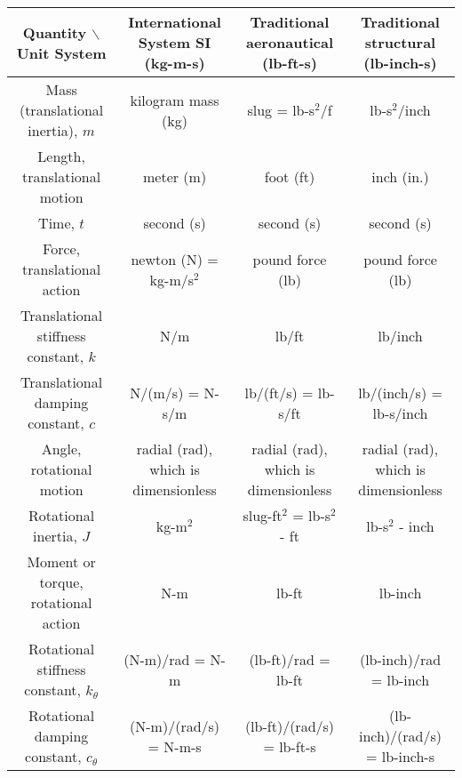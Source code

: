 \documentclass{article}
\begin{document}
\begin{CJK}{UTF8}{gbsn}


\begin{tabular}{|c|c|c|c|}
\hline
Quantity $\backslash$ Unit System & International System SI (kg-m-s) & Traditional aeronautical (lb-ft-s) & Traditional structural (lb-inch-s) \\
\hline
Mass (translational inertia), $m$ & kilogram mass (kg) & slug = lb-s$^2$/f & lb-s$^2$/inch \\
\hline
Length, translational motion & meter (m) & foot (ft) & inch (in.) \\
\hline
Time, $t$ & second (s) & second (s) & second (s) \\
\hline
Force, translational action & newton (N) = kg-m/s$^2$ & pound force (lb) & pound force (lb) \\
\hline
Translational stiffness constant, $k$ & N/m & lb/ft & lb/inch \\
\hline
Translational damping constant, $c$ & N/(m/s) = N-s/m & lb/(ft/s) = lb-s/ft & lb/(inch/s) = lb-s/inch \\
\hline
Angle, rotational motion & radial (rad), which is dimensionless & radial (rad), which is dimensionless & radial (rad), which is dimensionless \\
\hline
Rotational inertia, $J$ & kg-m$^2$ & slug-ft$^2$ = lb-s$^2$ - ft & lb-s$^2$ - inch \\
\hline
Moment or torque, rotational action & N-m & lb-ft & lb-inch \\
\hline
Rotational stiffness constant, $k_\theta$ & (N-m)/rad = N-m & (lb-ft)/rad = lb-ft & (lb-inch)/rad = lb-inch \\
\hline
Rotational damping constant, $c_\theta$ & (N-m)/(rad/s) = N-m-s & (lb-ft)/(rad/s) = lb-ft-s & (lb-inch)/(rad/s) = lb-inch-s \\
\hline
\end{tabular}

\end{CJK}
\end{document}
